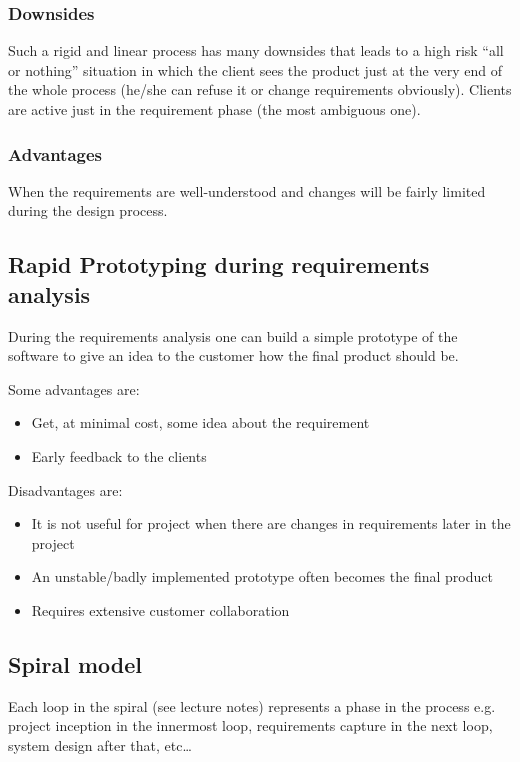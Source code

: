 \documentclass{article}
\begin{document}
	\subsubsection*{Downsides}
	Such a rigid and linear process has many downsides that leads to a high risk ``all or nothing''
	situation in which the client sees the product just at the very end of the whole process (he/she can refuse
	it or change requirements obviously). Clients are active just in the requirement phase (the most ambiguous one).
	
	\subsubsection*{Advantages}	
	When the requirements are well-understood and changes will be fairly limited during the design process.
	
	\subsection*{Rapid Prototyping during requirements analysis}
	During the requirements analysis one can build a simple prototype of the software to give an idea
	to the customer how the final product should be.
	
	Some advantages are:
	\begin{itemize}
		\item Get, at minimal cost, some idea about the requirement
		\item Early feedback to the clients
	\end{itemize}		
	
	Disadvantages are:
	\begin{itemize}
		\item It is not useful for project when there are changes in requirements later in the project
		\item An unstable/badly implemented prototype often becomes the final product
		\item Requires extensive customer collaboration
	\end{itemize}		
	
	\subsection*{Spiral model}
	Each loop in the spiral (see lecture notes) represents a phase in the process e.g. project inception in the innermost
	loop, requirements capture in the next loop, system design after that, etc\ldots
	
\end{document}
